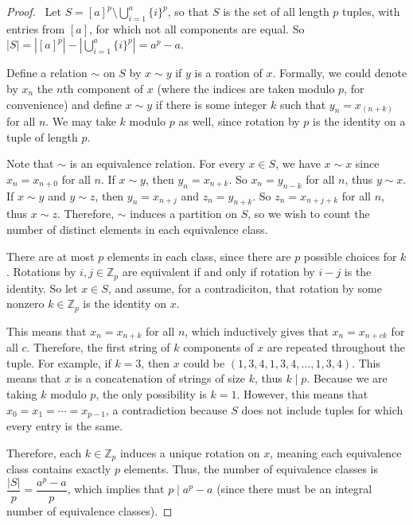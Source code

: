 \documentclass[12pt]{article}
\begin{document}
\begin{enumerate}[leftmargin=0cm,itemindent=.5cm,labelwidth=\itemindent,labelsep=0cm,align=left]
\begin{proof}

\ Let $S = [a]^p \setminus \bigcup_{i=1}^a \{i\}^p$, so that $S$ is the set of all length $p$ tuples, with entries from $[a]$, for which not all components are equal.  So $|S| = |[a]^p| - |\bigcup_{i=1}^a \{i\}^p| = a^p - a$.

Define a relation $\sim$ on $S$ by $x \sim y$ if $y$ is a roation of $x$.  Formally, we could denote by $x_n$ the $n$th component of $x$ (where the indices are taken modulo $p$, for convenience) and define $x \sim y$ if there is some integer $k$ such that $y_n = x_{(n+k)}$ for all $n$.  We may take $k$ modulo $p$ as well, since rotation by $p$ is the identity on a tuple of length $p$.

Note that $\sim$ is an equivalence relation.  For every $x \in S$, we have $x \sim x$ since $x_n = x_{n+0}$ for all $n$.  If $x \sim y$, then $y_n = x_{n+k}$.  So $x_n = y_{n-k}$ for all $n$, thus $y \sim x$.  If $x \sim y$ and $y \sim z$, then $y_n = x_{n+j}$ and $z_n = y_{n+k}$.  So $z_n = x_{n + j + k}$ for all $n$, thus $x \sim z$.  Therefore, $\sim$ induces a partition on $S$, so we wish to count the number of distinct elements in each equivalence class.

There are at most $p$ elements in each class, since there are $p$ possible choices for $k$.  Rotations by $i,j \in \mathbb{Z}_p$ are equivalent if and only if rotation by $i - j$ is the identity.  So let $x \in S$, and assume, for a contradiciton, that rotation by some nonzero $k \in \mathbb{Z}_p$ is the identity on $x$.

This means that $x_n = x_{n+k}$ for all $n$, which inductively gives that $x_n = x_{n+ck}$ for all $c$.  Therefore, the first string of $k$ components of $x$ are repeated throughout the tuple.  For example, if $k=3$, then $x$ could be $(1,3,4,1,3,4,...,1,3,4)$.  This means that $x$ is a concatenation of strings of size $k$, thus $k \mid p$.  Because we are taking $k$ modulo $p$, the only possibility is $k = 1$.  However, this means that $x_0 = x_1 = \cdots = x_{p-1}$, a contradiction because $S$ does not include tuples for which every entry is the same.

Therefore, each $k \in \mathbb{Z}_p$ induces a unique rotation on $x$, meaning each equivalence class contains exactly $p$ elements.  Thus, the number of equivalence classes is $\dfrac{|S|}{p} = \dfrac{a^p - a}{p}$, which implies that $p \mid a^p - a$ (since there must be an integral number of equivalence classes).


\end{proof}
\end{enumerate}
\end{document}
